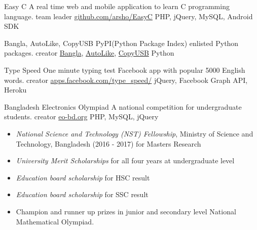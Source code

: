 \documentclass[10pt,a4paper]{altacv}
\begin{document}
\cvproject
{Easy C}
{A real time web and mobile application to learn C programming language.}
{team leader}
{\href{https://github.com/arsho/EasyC/}{github.com/arsho/EasyC}}
{PHP, jQuery, MySQL, Android SDK}
\divider

\cvproject
{Bangla, AutoLike, CopyUSB}
{PyPI(Python Package Index) enlisted Python packages.}
{creator}
{\href{https://pypi.python.org/pypi/bangla/}{Bangla}, \href{https://pypi.python.org/pypi/autolike/}{AutoLike}, \href{https://pypi.python.org/pypi/copyusb/}{CopyUSB}}
{Python}
\divider

\cvproject
{Type Speed}
{One minute typing test Facebook app with popular 5000 English words.}
{creator}
{\href{https://apps.facebook.com/type_speed/}{apps.facebook.com/type\_speed/}}
{jQuery, Facebook Graph API, Heroku}
\divider

\cvproject 
{Bangladesh Electronics Olympiad}
{A national competition for undergraduate students.}
{creator}
{\href{http://www.eo-bd.org/}{eo-bd.org}}
{PHP, MySQL, jQuery}




\clearpage

\begin{itemize}

\item \emph{National Science and Technology (NST) Fellowship}, Ministry of Science and Technology, Bangladesh (2016 - 2017) for Masters Research

\divider

\item \emph{University Merit Scholarships} for all four years at undergraduate level

\divider

\item \emph{Education board scholarship} for HSC result

\divider

\item \emph{Education board scholarship} for SSC result

\divider

\item Champion and runner up prizes in junior and secondary level National Mathematical Olympiad.

\end{itemize}
\end{document}
